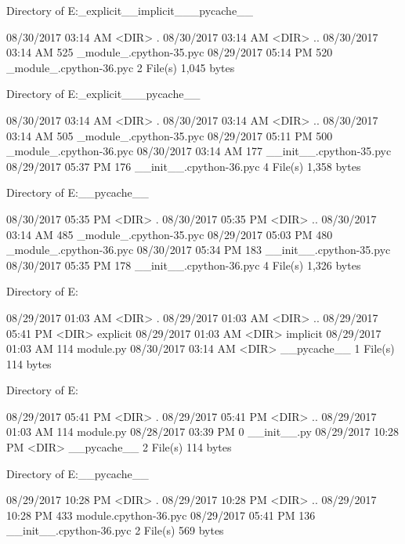 Directory of E:\Python\apeman\mockup\explicitImport\_explicit_\_implicit_\__pycache__

08/30/2017  03:14 AM    <DIR>          .
08/30/2017  03:14 AM    <DIR>          ..
08/30/2017  03:14 AM               525 _module_.cpython-35.pyc
08/29/2017  05:14 PM               520 _module_.cpython-36.pyc
               2 File(s)          1,045 bytes

 Directory of E:\Python\apeman\mockup\explicitImport\_explicit_\__pycache__

08/30/2017  03:14 AM    <DIR>          .
08/30/2017  03:14 AM    <DIR>          ..
08/30/2017  03:14 AM               505 _module_.cpython-35.pyc
08/29/2017  05:11 PM               500 _module_.cpython-36.pyc
08/30/2017  03:14 AM               177 __init__.cpython-35.pyc
08/29/2017  05:37 PM               176 __init__.cpython-36.pyc
               4 File(s)          1,358 bytes

 Directory of E:\Python\apeman\mockup\explicitImport\__pycache__

08/30/2017  05:35 PM    <DIR>          .
08/30/2017  05:35 PM    <DIR>          ..
08/30/2017  03:14 AM               485 _module_.cpython-35.pyc
08/29/2017  05:03 PM               480 _module_.cpython-36.pyc
08/30/2017  05:34 PM               183 __init__.cpython-35.pyc
08/30/2017  05:35 PM               178 __init__.cpython-36.pyc
               4 File(s)          1,326 bytes

 Directory of E:\Python\apeman\mockup\implicit

08/29/2017  01:03 AM    <DIR>          .
08/29/2017  01:03 AM    <DIR>          ..
08/29/2017  05:41 PM    <DIR>          explicit
08/29/2017  01:03 AM    <DIR>          implicit
08/29/2017  01:03 AM               114 module.py
08/30/2017  03:14 AM    <DIR>          __pycache__
               1 File(s)            114 bytes

 Directory of E:\Python\apeman\mockup\implicit\explicit

08/29/2017  05:41 PM    <DIR>          .
08/29/2017  05:41 PM    <DIR>          ..
08/29/2017  01:03 AM               114 module.py
08/28/2017  03:39 PM                 0 __init__.py
08/29/2017  10:28 PM    <DIR>          __pycache__
               2 File(s)            114 bytes

 Directory of E:\Python\apeman\mockup\implicit\explicit\__pycache__

08/29/2017  10:28 PM    <DIR>          .
08/29/2017  10:28 PM    <DIR>          ..
08/29/2017  10:28 PM               433 module.cpython-36.pyc
08/29/2017  05:41 PM               136 __init__.cpython-36.pyc
               2 File(s)            569 bytes

